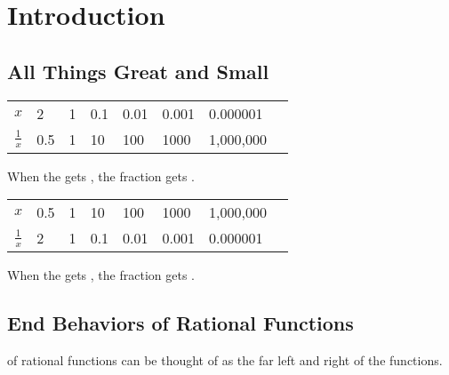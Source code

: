 \section{Introduction}

\subsection{All Things Great and Small}

\begin{minipage}{0.5\textwidth}
    \ttfamily\small
    \renewcommand{\arraystretch}{2}
    \begin{tabular}{c||lllllll}
        $x$ 
        & 2 & 1   & 0.1 & 0.01 & 0.001 & 0.000001 \\
        $\frac{1}{x} $
        & 0.5 & 1 & 10  & 100 & 1000   & 1,000,000\\
    \end{tabular}
\end{minipage}
\begin{minipage}{0.45\textwidth}
    When the  gets , 
    the fraction gets .
\end{minipage}

\begin{minipage}{0.5\textwidth}
\ttfamily\small
\renewcommand{\arraystretch}{2}
\begin{tabular}{c||lllllll}
    $x$ 
    & 0.5 & 1 & 10  & 100 & 1000   & 1,000,000\\
    $\frac{1}{x} $
    & 2 & 1   & 0.1 & 0.01 & 0.001 & 0.000001 \\
\end{tabular}
\end{minipage}
\begin{minipage}{0.45\textwidth}
    When the  gets , 
    the fraction gets .
\end{minipage}


\subsection{End Behaviors of Rational Functions}
  of rational functions 
can be thought of as the far left and right   of the functions.

